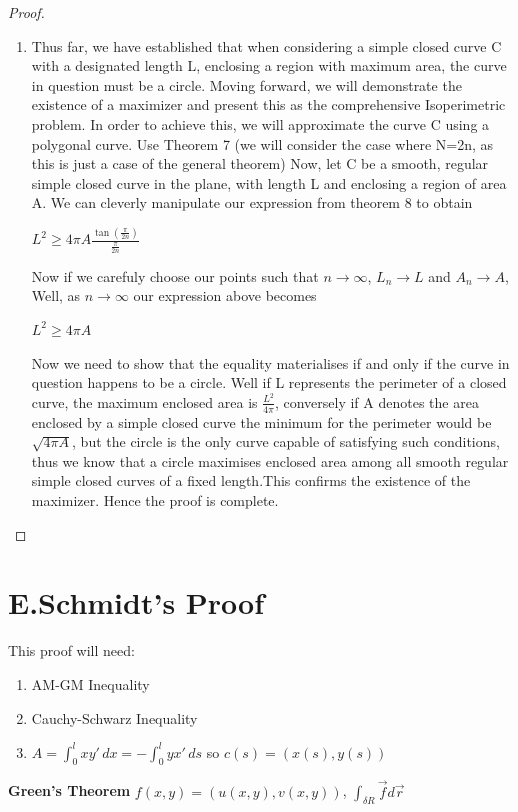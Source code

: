 \documentclass[a4paper]{book}
\numberwithin{theorem}{section}%
\begin{document}
\begin{proof}
\begin{enumerate}
        \item Thus far, we have established that when considering a simple closed curve C with a designated length L, enclosing a region with maximum area, the curve in question must be a circle. Moving forward, we will demonstrate the existence of a maximizer and present this as the comprehensive Isoperimetric problem. In order to achieve this, we will approximate the curve C using a polygonal curve. 
        Use Theorem 7 (we will consider the case where N=2n, as this is just a case of the general theorem)
        Now, let C be a smooth, regular simple closed curve in the plane, with length L and enclosing a region of area A. 
        We can cleverly manipulate our expression from theorem 8 to obtain
	\begin{center}
        $\displaystyle L^{2}\geq4\pi A \frac{\tan(\frac{\pi}{2n})}{\frac{\pi}{2n}}$
	\end{center}
        Now if we carefuly choose our points such that $n \to \infty $,  $L_{n} \to L$ and $A_{n} \to A$, 
        Well, as $n \to \infty$ our expression above becomes
	\begin{center}
        $L^{2}\geq4\pi A$
	\end{center}

        Now we need to show that the equality materialises if and only if the curve in question happens to be a circle. Well if L represents the perimeter of a closed curve, the maximum enclosed area is $\frac{L^{2}}{4\pi}$, conversely if A denotes the area enclosed by a simple closed curve the minimum for the perimeter would be $\sqrt{4 \pi A}$, but the circle is the only curve capable of satisfying such conditions, thus we know that a circle maximises enclosed area among all smooth regular simple closed curves of a fixed length.This confirms the existence of the maximizer. Hence the proof is complete.  
    \end{enumerate}
\end{proof}

\section{E.Schmidt's Proof}
This proof will need:
\begin{enumerate}
	\item AM-GM Inequality 
	\item Cauchy-Schwarz Inequality
	\item $A=\int_{0}^{l} xy' \,dx = -\int_{0}^{l} yx' \,ds$ so $c(s)=(x(s),y(s))$
\end{enumerate}
\textbf{Green's Theorem} $f(x,y)=(u(x,y),v(x,y))$, $\int_{\delta R}\overrightarrow{f} d\overrightarrow{r}$
\end{document}
